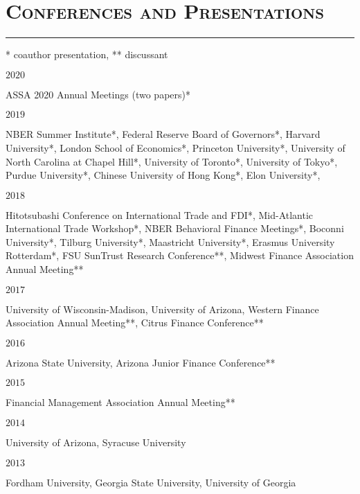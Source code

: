 \documentclass[10pt,letterpaper]{article}
\renewenvironment{itemize}{
  \begin{list}{}{
    \setlength{\leftmargin}{1.5em}
    \setlength{\itemsep}{0.25em}
    \setlength{\parskip}{0pt}
    \setlength{\parsep}{0.25em}
  }
}{
  \end{list}
}
\begin{document}
\section*{\textsc{Conferences and Presentations}}
\nointerlineskip
\vspace{-3mm}
\rule{\textwidth}{0.5mm}
* coauthor presentation, ** discussant

\bigskip
\begin{itemize}
\item $2020$

	ASSA 2020 Annual Meetings (two papers)*
	
\bigskip
\item $2019$

	NBER Summer Institute*, Federal Reserve Board of Governors*, Harvard University*, London School of Economics*, Princeton University*, University of North Carolina at Chapel Hill*, University of Toronto*, University of Tokyo*, Purdue University*, Chinese University of Hong Kong*, Elon University*, 

\bigskip
\item $2018$ 

Hitotsubashi Conference on International Trade and FDI*, Mid-Atlantic International Trade Workshop*, NBER Behavioral Finance Meetings*, Boconni University*, Tilburg University*, Maastricht University*, Erasmus University Rotterdam*, FSU SunTrust Research Conference**, Midwest Finance Association Annual Meeting** 
  
\bigskip
\item $2017$ 

University of Wisconsin-Madison, University of Arizona, Western Finance Association Annual Meeting**, Citrus Finance Conference**

\bigskip
\item $2016$ 

Arizona State University, Arizona Junior Finance Conference**

\bigskip
\item $2015$ 

Financial Management Association Annual Meeting**

\bigskip
\item $2014$ 

University of Arizona, Syracuse University

\bigskip
\item $2013$ 

Fordham University, Georgia State University, University of Georgia 

\end{itemize}
\end{document}

